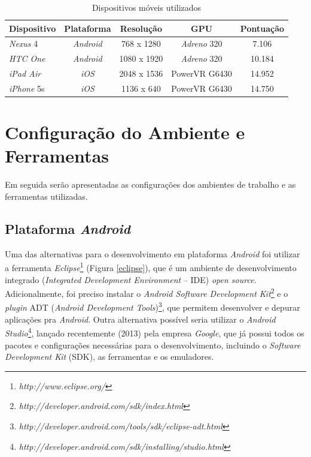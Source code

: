 \begin{table}[ht]
	\centering	
	\begin{tabular}{lcccc}
		\toprule
		\textbf{Dispositivo} & \textbf{Plataforma}  & \textbf{Resolução} & \textbf{GPU} & \textbf{Pontuação} \\
		\midrule
		\textit{Nexus} 4 &  \textit{Android} & 768 x 1280 &  \textit{Adreno} 320 & 7.106\\
		\textit{HTC One} &  \textit{Android} & 1080 x 1920 &  \textit{Adreno} 320 & 10.184\\ 
		\textit{iPad Air} &  \textit{iOS} & 2048 x 1536  &  PowerVR G6430 & 14.952\\
		\textit{iPhone} 5s &  \textit{iOS} & 1136 x 640  &  PowerVR G6430 & 14.750\\
		\bottomrule
	\end{tabular}
	\caption{Dispositivos móveis utilizados}
	\label{equipamentos}
\end{table}


\section{Configuração do Ambiente e Ferramentas}
\label{configamb}	

	Em seguida serão apresentadas as configurações dos ambientes de trabalho e as ferramentas utilizadas.

\subsection{Plataforma \textit{Android}}

	Uma das alternativas para o desenvolvimento em plataforma \textit{Android} foi utilizar a ferramenta \textit{Eclipse}\footnote{\textit{http://www.eclipse.org/}} (Figura \ref{eclipse}), que é um ambiente de desenvolvimento integrado (\textit{Integrated Development Environment} -- IDE) \textit{open source}. Adicionalmente, foi preciso instalar o \textit{Android Software Development Kit}\footnote{\textit{http://developer.android.com/sdk/index.html}} e o \textit{plugin} ADT (\textit{Android Development Tools})\footnote{\textit{http://developer.android.com/tools/sdk/eclipse-adt.html}}, que permitem desenvolver e depurar aplicações pra \textit{Android}. Outra alternativa possível seria utilizar o \textit{Android Studio}\footnote{\textit{http://developer.android.com/sdk/installing/studio.html}}, lançado recentemente (2013) pela empresa \textit{Google}, que já possui todos os pacotes e configurações necessárias para o desenvolvimento, incluindo o  \textit{Software Development Kit} (SDK), as ferramentas e os emuladores. 

